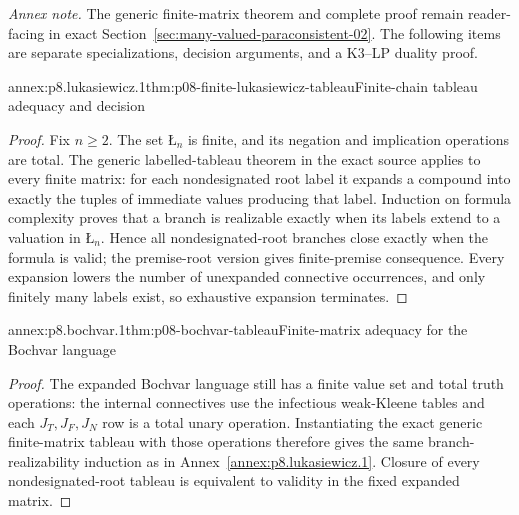 \noindent\textit{Annex note.} The generic finite-matrix theorem and complete
proof remain reader-facing in exact
Section~\ref{sec:many-valued-paraconsistent-02}. The following items are
separate specializations, decision arguments, and a K3--LP duality proof.

\begin{annexitem}{annex:p8.lukasiewicz.1}{thm:p08-finite-lukasiewicz-tableau}{Finite-chain tableau adequacy and decision}
\begin{proof}
Fix \(n\geq2\).  The set \(\text{\L}_n\) is finite, and its negation and
implication operations are total.  The generic labelled-tableau theorem in the
exact source applies to every finite matrix: for each nondesignated root label
it expands a compound into exactly the tuples of immediate values producing
that label.  Induction on formula complexity proves that a branch is realizable
exactly when its labels extend to a valuation in \(\text{\L}_n\).  Hence all
nondesignated-root branches close exactly when the formula is valid; the
premise-root version gives finite-premise consequence.  Every expansion lowers
the number of unexpanded connective occurrences, and only finitely many labels
exist, so exhaustive expansion terminates.
\end{proof}
\end{annexitem}

\begin{annexitem}{annex:p8.bochvar.1}{thm:p08-bochvar-tableau}{Finite-matrix adequacy for the Bochvar language}
\begin{proof}
The expanded Bochvar language still has a finite value set and total truth
operations: the internal connectives use the infectious weak-Kleene tables and
each \(J_T,J_F,J_N\) row is a total unary operation.  Instantiating the exact
generic finite-matrix tableau with those operations therefore gives the same
branch-realizability induction as in Annex~\ref{annex:p8.lukasiewicz.1}.
Closure of every nondesignated-root tableau is equivalent to validity in the
fixed expanded matrix.
\end{proof}
\end{annexitem}

